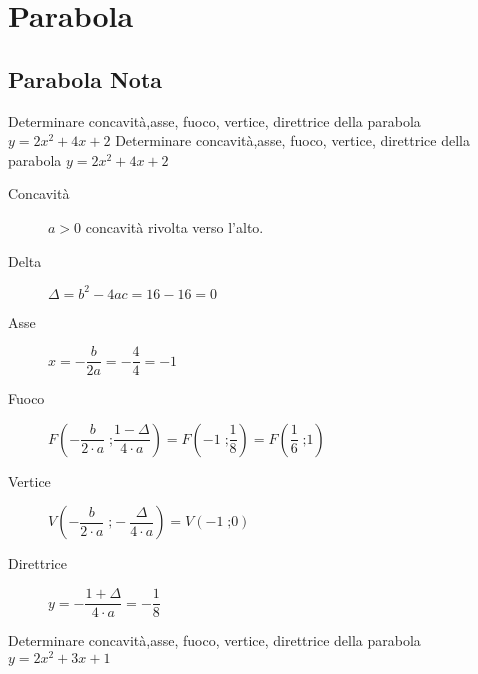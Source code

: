 \tcbstartrecording
\chapter{Parabola}
\section{Parabola Nota}
 \begin{exercise}
	Determinare concavità,asse, fuoco, vertice, direttrice della parabola $y=2x^2+4x+2$
	\tcblower
	Determinare concavità,asse, fuoco, vertice, direttrice della parabola $y=2x^2+4x+2$
	\begin{description}
		\item[Concavità] $a>0$ concavità rivolta verso l'alto.
		\item[Delta] $\Delta=b^2-4ac=16-16=0$
		\item[Asse] $x=-\dfrac{b}{2a}=-\dfrac{4}{4}=-1$
		\item[Fuoco] $F\left(-\dfrac{b}{2\cdot a}\;\text{;}\dfrac{1-\Delta}{4\cdot a}\right)=F\left(-1\;\text{;}\dfrac{1}{8}\right)=F\left(\dfrac{1}{6}\;\text{;} 1\right)$
		\item[Vertice] $V\left(-\dfrac{b}{2\cdot a}\;\text{;}-\dfrac{\Delta}{4\cdot a}\right)=V\left(-1\;\text{;}0\right)$
		\item[Direttrice] $y=-\dfrac{1+\Delta}{4\cdot a}=-\dfrac{1}{8}$
	\end{description}
\end{exercise}
\begin{exercise}[no solution]
	Determinare concavità,asse, fuoco, vertice, direttrice della parabola $y=2x^2+3x+1$
\end{exercise}

